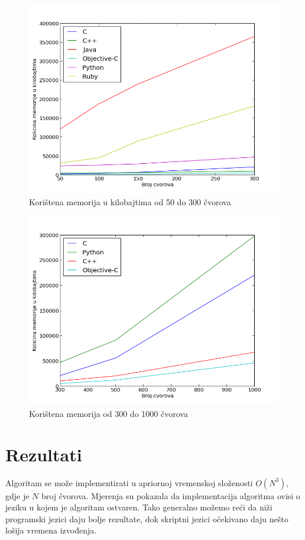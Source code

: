 \documentclass[times, utf8, seminar, numeric]{fer}
\begin{document}
\begin{figure}[!h]
\centering
\includegraphics[scale=0.6]{./img/memorija_300.png}
\caption{Korištena memorija u kilobajtima od 50 do 300 čvorova}
\label{fig:memorija_300}
\end{figure}

\begin{figure}[!h]
\centering
\includegraphics[scale=0.6]{./img/memorija_1000.png}
\caption{Korištena memorija od 300 do 1000 čvorova}
\label{fig:memorija_1000}
\end{figure}

\section{Rezultati}
Algoritam se može implementirati u apriornoj vremenskoj složenosti $O(N^3)$, gdje je $N$ broj čvorova. Mjerenja su pokazala da implementacija algoritma ovisi o jeziku u kojem je algoritam ostvaren. Tako generalno možemo reći da niži programski jezici daju bolje rezultate, dok skriptni jezici očekivano daju nešto lošija vremena izvođenja.
\end{document}
